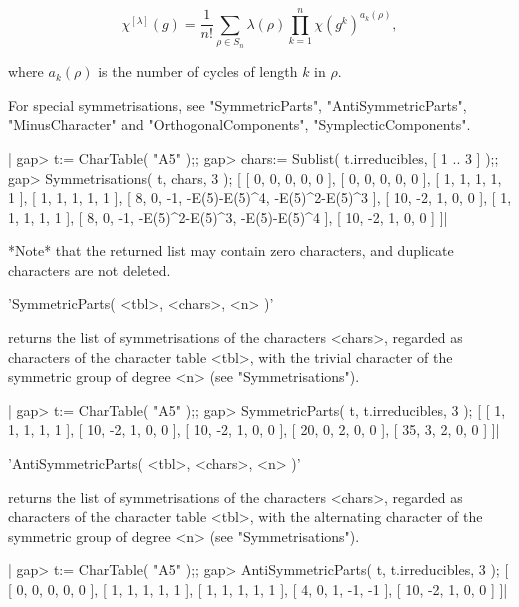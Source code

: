\[ \chi^{[\lambda]}(g) = \frac{1}{n!} \sum_{\rho \in S_n}
                \lambda(\rho) \prod_{k=1}^{n} \chi(g^k)^{a_k(\rho)}, \]

where $a_k(\rho)$ is the number of cycles of length $k$ in $\rho$.

For special  symmetrisations, see "SymmetricParts", "AntiSymmetricParts",
"MinusCharacter" and "OrthogonalComponents", "SymplecticComponents".

|    gap> t:= CharTable( "A5" );;
    gap> chars:= Sublist( t.irreducibles, [ 1 .. 3 ] );;
    gap> Symmetrisations( t, chars, 3 );
    [ [ 0, 0, 0, 0, 0 ], [ 0, 0, 0, 0, 0 ], [ 1, 1, 1, 1, 1 ],
      [ 1, 1, 1, 1, 1 ], [ 8, 0, -1, -E(5)-E(5)^4, -E(5)^2-E(5)^3 ],
      [ 10, -2, 1, 0, 0 ], [ 1, 1, 1, 1, 1 ],
      [ 8, 0, -1, -E(5)^2-E(5)^3, -E(5)-E(5)^4 ], [ 10, -2, 1, 0, 0 ] ]|

*Note* that the returned list may contain zero characters, and duplicate
characters are not deleted.

%

'SymmetricParts( <tbl>, <chars>, <n> )'

returns  the list of  symmetrisations of the characters <chars>, regarded
as characters of the character table <tbl>, with the trivial character of
the symmetric group of degree <n> (see "Symmetrisations").

|    gap> t:= CharTable( "A5" );;
    gap> SymmetricParts( t, t.irreducibles, 3 );
    [ [ 1, 1, 1, 1, 1 ], [ 10, -2, 1, 0, 0 ], [ 10, -2, 1, 0, 0 ],
      [ 20, 0, 2, 0, 0 ], [ 35, 3, 2, 0, 0 ] ]|

%

'AntiSymmetricParts( <tbl>, <chars>, <n> )'

returns the list of symmetrisations  of the characters <chars>,  regarded
as  characters  of the  character    table <tbl>,  with  the  alternating
character of the symmetric group of degree <n> (see "Symmetrisations").

|    gap> t:= CharTable( "A5" );;
    gap> AntiSymmetricParts( t, t.irreducibles, 3 );
    [ [ 0, 0, 0, 0, 0 ], [ 1, 1, 1, 1, 1 ], [ 1, 1, 1, 1, 1 ],
      [ 4, 0, 1, -1, -1 ], [ 10, -2, 1, 0, 0 ] ]|

%

